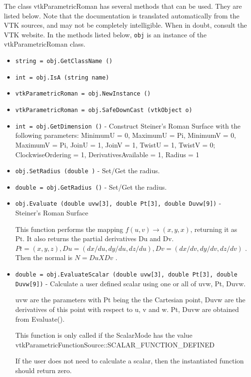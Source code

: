 The class vtkParametricRoman has several methods that can be used.
  They are listed below.
Note that the documentation is translated automatically from the VTK sources,
and may not be completely intelligible.  When in doubt, consult the VTK website.
In the methods listed below, \verb|obj| is an instance of the vtkParametricRoman class.
\begin{itemize}
\item  \verb|string = obj.GetClassName ()|

\item  \verb|int = obj.IsA (string name)|

\item  \verb|vtkParametricRoman = obj.NewInstance ()|

\item  \verb|vtkParametricRoman = obj.SafeDownCast (vtkObject o)|

\item  \verb|int = obj.GetDimension ()| -  Construct Steiner's Roman Surface with the following parameters:
 MinimumU = 0, MaximumU = Pi,
 MinimumV = 0, MaximumV = Pi, 
 JoinU = 1, JoinV = 1,
 TwistU = 1, TwistV = 0; 
 ClockwiseOrdering = 1, 
 DerivativesAvailable = 1,
 Radius = 1

\item  \verb|obj.SetRadius (double )| -  Set/Get the radius.

\item  \verb|double = obj.GetRadius ()| -  Set/Get the radius.

\item  \verb|obj.Evaluate (double uvw[3], double Pt[3], double Duvw[9])| -  Steiner's Roman Surface

 This function performs the mapping $f(u,v) \rightarrow (x,y,x)$, returning it
 as Pt. It also returns the partial derivatives Du and Dv.
 $Pt = (x, y, z), Du = (dx/du, dy/du, dz/du), Dv = (dx/dv, dy/dv, dz/dv)$ .
 Then the normal is $N = Du X Dv$ .

\item  \verb|double = obj.EvaluateScalar (double uvw[3], double Pt[3], double Duvw[9])| -  Calculate a user defined scalar using one or all of uvw, Pt, Duvw.

 uvw are the parameters with Pt being the the Cartesian point, 
 Duvw are the derivatives of this point with respect to u, v and w.
 Pt, Duvw are obtained from Evaluate().

 This function is only called if the ScalarMode has the value
 vtkParametricFunctionSource::SCALAR\_FUNCTION\_DEFINED

 If the user does not need to calculate a scalar, then the 
 instantiated function should return zero. 


\end{itemize}
